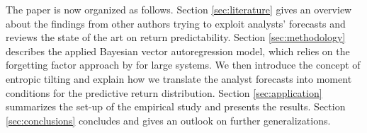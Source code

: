 %
\indent The paper is now organized as follows. Section \ref{sec:literature} gives an overview about the findings from other authors trying to exploit analysts' forecasts and reviews the state of the art on return predictability. Section \ref{sec:methodology} describes the applied Bayesian vector autoregression model, which relies on the forgetting factor approach by \cite{koop2013} for large systems. We then introduce the concept of entropic tilting and explain how we translate the analyst forecasts into moment conditions for the predictive return distribution. Section \ref{sec:application} summarizes the set-up of the empirical study and presents the results. Section \ref{sec:conclusions} concludes and gives an outlook on further generalizations.






	